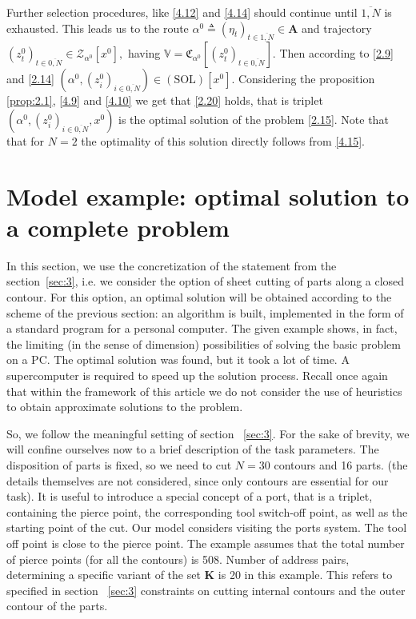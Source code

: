 \documentclass[10pt]{article}
\begin{document}
Further selection procedures,
like \eqref{4.12} and \eqref{4.14}
should continue until
$\overline{1, N}$ is exhausted.
This leads us to the route
$\alpha^0 {\triangleq} (\eta_t)_{t \in \overline{1,N}} \in \mathbf{A}$
and trajectory
$(z_t^0)_{t \in \overline{0,N}} \in \mathcal{Z}_{\alpha^0}[x^0],$
having
$\mathbb{V} = \mathfrak{C}_{\alpha^0}[(z_t^0)_{t \in \overline{0,N}}]$.
Then according to
\eqref{2.9} and \eqref{2.14}
$(\alpha^0,(z_i^0)_{i \in \overline{0,N}}) \in (\mathrm{\mathrm{SOL}})[x^0]$.
Considering the proposition
\ref{prop:2.1}, \eqref{4.9} and \eqref{4.10}
we get that \eqref{2.20} holds,
that is triplet
$(\alpha^0,(z_i^0)_{i \in \overline{0,N}},x^0)$
is the optimal solution of the problem
\eqref{2.15}.
Note that
that for $ N = 2 $
the optimality of this solution directly follows from
\eqref{4.15}.

\section{Model example: optimal solution to a complete problem}
\label{sec:5}

In this section, we use the concretization of the statement
from the section~\ref{sec:3},
i.e. we consider the option of sheet cutting of parts along a closed contour.
For this option, an optimal solution will be obtained according to the scheme of the previous section:
an algorithm is built, implemented in the form of a standard program for a personal computer.
The given example shows, in fact, the limiting (in the sense of dimension) possibilities of solving the basic problem on a PC.
The optimal solution was found, but it took a lot of time.
A supercomputer is required to speed up the solution process.
Recall once again that within the framework of this article
we do not consider the use of heuristics
to obtain approximate solutions to the problem.

So, we follow the meaningful setting of section ~\ref{sec:3}.
For the sake of brevity,
we will confine ourselves now to a brief description of the task parameters.
The disposition of parts is fixed,
so we need to cut
$N = 30$
contours
and 16 parts.
(the details themselves are not considered,
since only contours are essential for our task).
It is useful to introduce a special concept of a port,
that is a triplet,
containing the pierce point,
the corresponding tool switch-off point,
as well as the starting point of the cut.
Our model considers
visiting the ports system.
The tool off point is close to the pierce point.
The example assumes that the total number of pierce points
(for all the contours)
is 508.
Number of address pairs,
determining a specific variant of the set
$\mathbf{K}$
is 20
in this example.
This refers to specified in section ~\ref{sec:3}
constraints
on  cutting internal contours
and the outer contour of the parts.
\end{document}
